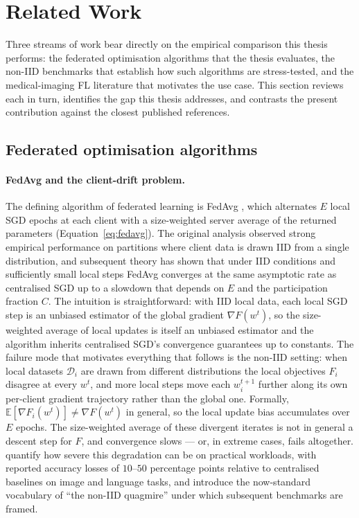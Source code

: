 \documentclass[11pt,a4paper]{article}
\begin{document}
\section{Related Work}\label{sec:related}
Three streams of work bear directly on the empirical comparison this thesis
performs: the federated optimisation algorithms that the thesis evaluates, the
non-IID benchmarks that establish how such algorithms are stress-tested, and
the medical-imaging FL literature that motivates the use case. This section
reviews each in turn, identifies the gap this thesis addresses, and contrasts
the present contribution against the closest published references.

\subsection{Federated optimisation algorithms}
\label{sec:rw-algorithms}

\paragraph{FedAvg and the client-drift problem.}
The defining algorithm of federated learning is FedAvg
\citep{mcmahan2017fedavg}, which alternates $E$ local SGD epochs at each
client with a size-weighted server average of the returned parameters
(Equation~\ref{eq:fedavg}). The original analysis observed strong empirical
performance on partitions where client data is drawn IID from a single
distribution, and subsequent theory has shown that under IID conditions and
sufficiently small local steps FedAvg converges at the same asymptotic rate
as centralised SGD up to a slowdown that depends on $E$ and the participation
fraction $C$. The intuition is straightforward: with IID local data, each
local SGD step is an unbiased estimator of the global gradient
$\nabla F(w^t)$, so the size-weighted average of local updates is itself an
unbiased estimator and the algorithm inherits centralised SGD's convergence
guarantees up to constants. The failure mode that motivates everything that
follows is the non-IID setting: when local datasets $\mathcal{D}_i$ are drawn
from different distributions the local objectives $F_i$ disagree at every
$w^t$, and more local steps move each $w_i^{t+1}$ further along its own
per-client gradient trajectory rather than the global one. Formally,
$\mathbb{E}\!\left[\nabla F_i(w^t)\right] \ne \nabla F(w^t)$ in general, so
the local update bias accumulates over $E$ epochs. The size-weighted average
of these divergent iterates is not in general a descent step for $F$, and
convergence slows --- or, in extreme cases, fails altogether.
\citet{hsieh2020quagmire} quantify how severe this degradation can be on
practical workloads, with reported accuracy losses of $10$--$50$ percentage
points relative to centralised baselines on image and language tasks, and
introduce the now-standard vocabulary of ``the non-IID quagmire'' under
which subsequent benchmarks are framed.
\end{document}
